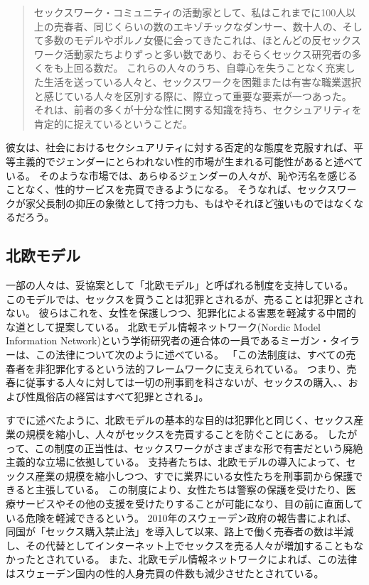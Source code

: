 \documentclass[paper=a4,book,openany]{jlreq} \usepackage{mystyle}
\begin{document}
\begin{quote}
セックスワーク・コミュニティの活動家として、私はこれまでに100人以上の売春者、同じくらいの数のエキゾチックなダンサー、数十人の、そして多数のモデルやポルノ女優に会ってきた{\DDASH}これは、ほとんどの反セックスワーク活動家たちよりずっと多い数であり、おそらくセックス研究者の多くをも上回る数だ。
これらの人々のうち、自尊心を失うことなく充実した生活を送っている人々と、セックスワークを困難または有害な職業選択と感じている人々を区別する際に、際立って重要な要素が一つあった。
それは、前者の多くが十分な性に関する知識を持ち、セクシュアリティを肯定的に捉えているということだ。
\citep[pp.128--129]{queen97:_sex_radic_polit_sex_posit}
\end{quote}

彼女は、社会におけるセクシュアリティに対する否定的な態度を克服すれば、平等主義的でジェンダーにとらわれない性的市場が生まれる可能性があると述べている。
そのような市場では、あらゆるジェンダーの人々が、恥や汚名を感じることなく、性的サービスを売買できるようになる。
そうなれば、セックスワークが家父長制の抑圧の象徴として持つ力も、もはやそれほど強いものではなくなるだろう。

\subsection{北欧モデル}

一部の人々は、妥協案として「北欧モデル」と呼ばれる制度を支持している。
このモデルでは、セックスを買うことは犯罪とされるが、売ることは犯罪とされない。
彼らはこれを、女性を保護しつつ、犯罪化による害悪を軽減する中間的な道として提案している。
北欧モデル情報ネットワーク(Nordic Model Information Network)という学術研究者の連合体の一員であるミーガン・タイラーは、この法律について次のように述べている。
「この法制度は、すべての売春者を非犯罪化するという法的フレームワークに支えられている。
つまり、売春に従事する人々に対しては一切の刑事罰を科さないが、セックスの購入、、および性風俗店の経営はすべて犯罪とされる」\citep{woodward16:_calls_austr_adopt_nordic_model_prost}。

すでに述べたように、北欧モデルの基本的な目的は犯罪化と同じく、セックス産業の規模を縮小し、人々がセックスを売買することを防ぐことにある。
したがって、この制度の正当性は、セックスワークがさまざまな形で有害だという廃絶主義的な立場に依拠している。
支持者たちは、北欧モデルの導入によって、セックス産業の規模を縮小しつつ、すでに業界にいる女性たちを刑事罰から保護できると主張している。
この制度により、女性たちは警察の保護を受けたり、医療サービスやその他の支援を受けたりすることが可能になり、目の前に直面している危険を軽減できるという。
2010年のスウェーデン政府の報告書によれば、同国が「セックス購入禁止法」を導入して以来、路上で働く売春者の数は半減し、その代替としてインターネット上でセックスを売る人々が増加することもなかったとされている\citep{sweden10:_repor_sou}。
また、北欧モデル情報ネットワークによれば、この法律はスウェーデン国内の性的人身売買の件数も減少させたとされている\citep[p.25]{commons16:_prost}。
\end{document}
